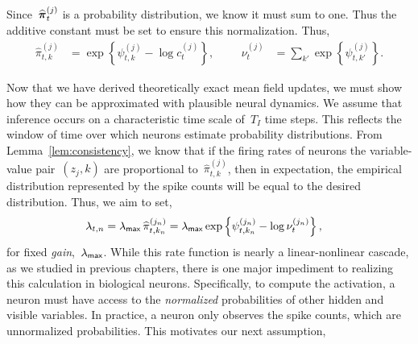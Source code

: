 Since~$\widehat{\boldsymbol{\pi}}_{t}^{(j)}$ is a probability distribution, we
know it must sum to one. Thus the additive constant must be set to
ensure this normalization.  Thus,
\begin{align}
  \widehat{\pi}_{t,k}^{(j)} &=
  \exp \left \{\psi_{t,k}^{(j)} -\log c_{t}^{(j)} \right \},
  & & &
  \nu_t^{(j)} &= \sum_{k'} \exp \left \{\psi_{t,k'}^{(j)} \right \}.
\end{align}


Now that we have derived theoretically exact mean field updates, we
must show how they can be approximated with plausible neural dynamics.
We assume that inference occurs on a characteristic time scale of~$T_I$
time steps. This reflects the window of time over which neurons estimate
probability distributions.
From Lemma~\ref{lem:consistency}, we know that if the firing rates of
neurons the variable-value pair~${(z_j,k)}$ are proportional
to~$\widehat{\pi}_{t,k}^{(j)}$, then in expectation, the empirical
distribution represented by the spike counts will be equal to the
desired distribution. Thus, we aim to set,
\begin{align}
  \lambda_{t,n} &= \lambda_{\mathsf{max}} \, \widehat{\pi}_{t,k_n}^{(j_n)}
  = \lambda_{\mathsf{max}} \exp \left \{\psi_{t,k_n}^{(j_n)} -\log \nu_{t}^{(j_n)} \right \},
\end{align}
for fixed \emph{gain},~$\lambda_{\mathsf{max}}$. While this rate function is
nearly a linear-nonlinear cascade, as we studied in previous
chapters, there is one major impediment to realizing this
calculation in biological neurons. Specifically, to compute
the activation, a neuron must have access to the \emph{normalized}
probabilities of other hidden and visible variables. In practice,
a neuron only observes the spike counts, which are
unnormalized probabilities. This motivates our next assumption,

